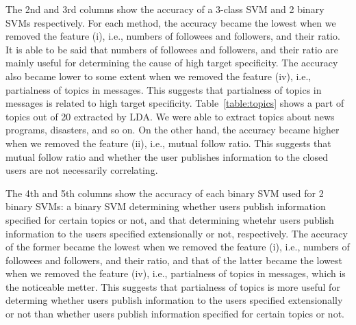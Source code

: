 The 2nd and 3rd columns show the accuracy of a 3-class SVM
and 2 binary SVMs respectively.  For each method, the accuracy became
the lowest when we removed the feature (i), i.e., numbers of followees and
followers, and their ratio.  It is able to be said that numbers of
followees and followers, and their ratio are mainly useful for
determining the cause of high target specificity.  The accuracy also
became lower to some extent when we removed the feature (iv), i.e.,
partialness of topics in messages.  This suggests that partialness of
topics in messages is related to high target specificity.
Table~\ref{table:topics} shows a part of topics out of 20 extracted by
LDA.  We were able to extract topics about news programs, disasters, and
so on.  On the other hand, the accuracy became higher when we removed
the feature (ii), i.e., mutual follow ratio.  This suggests that mutual
follow ratio and whether the user publishes information to the closed
users are not necessarily correlating.

The 4th and 5th columns show the accuracy of each binary SVM used for
2 binary SVMs: a binary SVM determining whether users publish
information specified for certain topics or not, and that determining
whetehr users publish information to the users specified extensionally
or not,
respectively.  The accuracy of the former became the lowest when we
removed the feature (i), i.e., numbers of followees and followers, and their
ratio, and that of the latter became the lowest when we removed the
feature (iv), i.e., partialness of topics in messages, which is the noticeable
metter.  This suggests that partialness of topics is more useful for
determing whether users publish information to the users specified
extensionally or not than whether users publish information specified
for certain topics or not.
